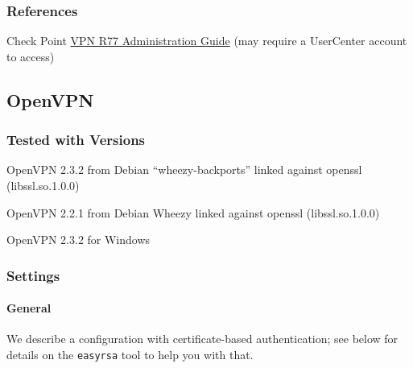 

\subsubsection{References}
\begin{itemize*}
  \item Check Point \href{https://sc1.checkpoint.com/documents/R77/CP_R77_VPN_AdminGuide/html_frameset.htm}{VPN R77 Administration Guide} (may require a UserCenter account to access)
\end{itemize*}


\subsection{OpenVPN}

\subsubsection{Tested with Versions}
\begin{itemize*}
  \item OpenVPN 2.3.2 from Debian ``wheezy-backports'' linked against openssl (libssl.so.1.0.0)
  \item OpenVPN 2.2.1 from Debian Wheezy linked against openssl
    (libssl.so.1.0.0)
  \item OpenVPN 2.3.2 for Windows
\end{itemize*}

\subsubsection{Settings}

\paragraph{General}
We describe a configuration with certificate-based authentication; see
below for details on the \verb|easyrsa| tool to help you with that.


